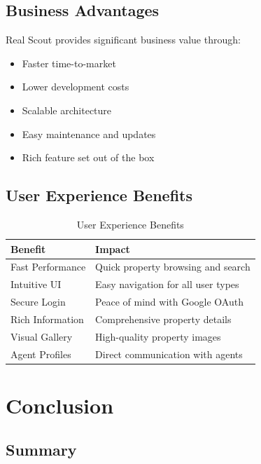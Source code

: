 \documentclass[11pt,a4paper,oneside]{book}
\begin{document}
\section{Business Advantages}

\begin{keypoint}
Real Scout provides significant business value through:
\begin{itemize}
    \item Faster time-to-market
    \item Lower development costs
    \item Scalable architecture
    \item Easy maintenance and updates
    \item Rich feature set out of the box
\end{itemize}
\end{keypoint}

\section{User Experience Benefits}

\begin{table}[h]
\centering
\begin{tabularx}{\textwidth}{l X}
\toprule
\textbf{Benefit} & \textbf{Impact} \\
\midrule
Fast Performance & Quick property browsing and search \\
Intuitive UI & Easy navigation for all user types \\
Secure Login & Peace of mind with Google OAuth \\
Rich Information & Comprehensive property details \\
Visual Gallery & High-quality property images \\
Agent Profiles & Direct communication with agents \\
\bottomrule
\end{tabularx}
\caption{User Experience Benefits}
\end{table}

\chapter{Conclusion}

\section{Summary}
\end{document}
